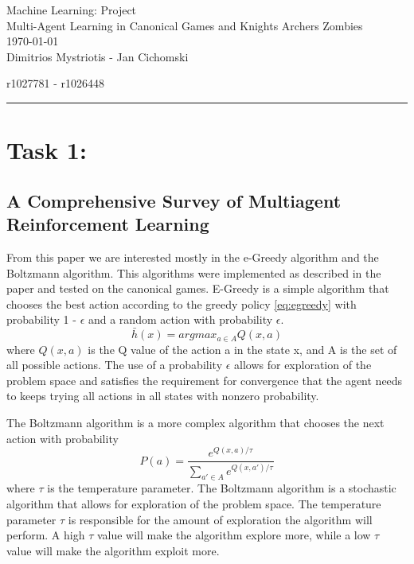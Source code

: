 \documentclass[12pt,letterpaper, onecolumn]{exam}
\begin{document}
\begingroup  
    \centering
    \LARGE Machine Learning: Project\\
    \LARGE Multi-Agent Learning in Canonical Games and Knights Archers Zombies\\[0.5em]
    \large \today\\[0.5em]
    \large Dimitrios Mystriotis - Jan Cichomski\par
    \large r1027781 - r1026448\par
\endgroup
\rule{\textwidth}{0.4pt}
\pointsdroppedatright   %
\printanswers
\renewcommand{\solutiontitle}{\noindent\textbf{Ans:}\enspace}   %

\section{\textbf{Task 1:}}

\subsection{A Comprehensive Survey of Multiagent Reinforcement Learning}

From this paper we are interested mostly in the e-Greedy algorithm and the Boltzmann algorithm. This algorithms were implemented as described in the paper and tested on the canonical games.
E-Greedy is a simple algorithm that chooses the best action according to the greedy policy \ref{eq:egreedy} with probability 1 - $\epsilon$ and a random action with probability $\epsilon$.
\begin{equation}\label{eq:egreedy}
    \bar{h}(x) = argmax_{a \in A} Q(x,a)
\end{equation}
where $Q(x,a)$ is the Q value of the action a in the state x, and A is the set of all possible actions.
The use of a probability $\epsilon$ allows for exploration of the problem space and satisfies the requirement for convergence that the agent needs to keeps trying all actions
in all states with nonzero probability.

The Boltzmann algorithm is a more complex algorithm that chooses the next action with probability
\begin{equation}\label{eq:boltzmann}
    P(a) = \frac{e^{Q(x,a)/\tau}}{\sum_{a' \in A} e^{Q(x,a')/\tau}}
\end{equation}
where $\tau$ is the temperature parameter. The Boltzmann algorithm is a stochastic algorithm that allows for exploration of the problem space. The temperature parameter $\tau$ is responsible
for the amount of exploration the algorithm will perform. A high $\tau$ value will make the algorithm explore more, while a low $\tau$ value will make the algorithm exploit more.
\end{document}
